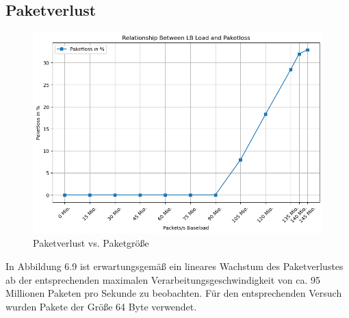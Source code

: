 \subsection{Paketverlust}
\begin{figure}
    \centering
    \includegraphics[width=0.8\linewidth]{images/packetloss.png}
    \caption{Paketverlust vs. Paketgröße}
    \label{fig:enter-label}
\end{figure}
In Abbildung 6.9 ist erwartungsgemäß ein lineares Wachstum des Paketverlustes ab der entsprechenden maximalen Verarbeitungsgeschwindigkeit von ca. 95 Millionen Paketen pro Sekunde zu beobachten. Für den entsprechenden Versuch wurden Pakete der Größe 64 Byte verwendet.